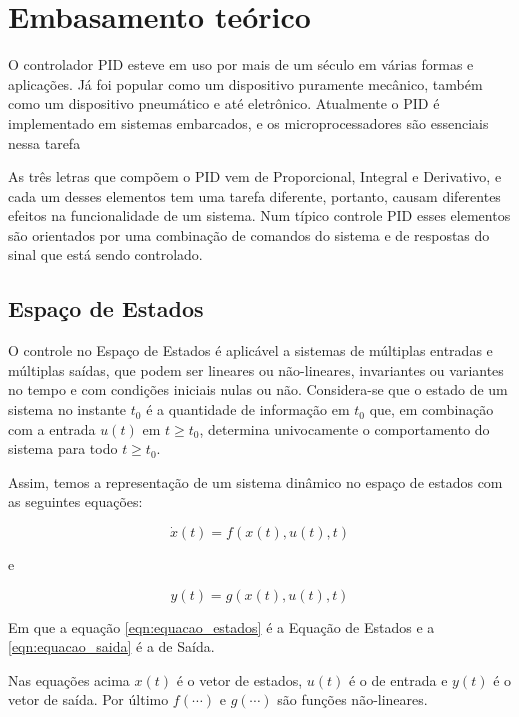 \documentclass[
	12pt,				%
	openany,			%
	oneside,			%
	a4paper,			%
	english,			%
	french,				%
	spanish,			%
	brazil,				%
	]{abntex2}
\begin{document}
{%
\chapter{Embasamento teórico}

O controlador PID esteve em uso por mais de um século em várias formas e aplicações. Já foi popular como um dispositivo puramente mecânico, também como um dispositivo pneumático e até eletrônico. Atualmente o PID é implementado em sistemas embarcados, e os microprocessadores são essenciais nessa tarefa \cite{timwescott1}

As três letras que compõem o PID vem de Proporcional, Integral e Derivativo, e cada um desses elementos tem uma tarefa diferente, portanto, causam diferentes efeitos na funcionalidade de um sistema. Num típico controle PID esses elementos são orientados por uma combinação de comandos do sistema e de respostas do sinal que está sendo controlado.


\section{Espaço de Estados}

O controle no Espaço de Estados é aplicável a sistemas de múltiplas entradas e múltiplas saídas, que podem ser lineares ou não-lineares, invariantes ou variantes no tempo e com condições iniciais nulas ou não. Considera-se que o estado de um sistema no instante $t_0$ é a quantidade de informação em $t_0$ que, em combinação com a entrada $u(t)$ em $t \geq t_0$, determina univocamente o comportamento do sistema para todo $t \geq t_0$.

Assim, temos a representação de um sistema dinâmico no espaço de estados com as seguintes equações:

\begin{equation}
	\dot{x}(t) = f(x(t), u(t),t)
	\label{eqn:equacao_estados}
\end{equation}

e

\begin{equation}
	y(t) = g(x(t), u(t),t)
	\label{eqn:equacao_saida}
\end{equation}

Em que a equação \ref{eqn:equacao_estados} é a Equação de Estados e a \ref{eqn:equacao_saida} é a de Saída.

Nas equações acima $x(t)$ é o vetor de estados, $u(t)$ é o de entrada e $y(t)$ é o vetor de saída. Por último $f(\cdots)$ e $g(\cdots)$ são funções não-lineares.

}
\end{document}
